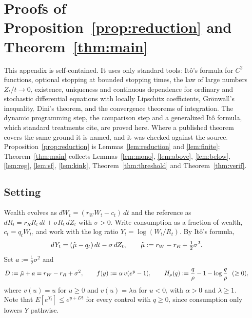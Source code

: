 \section{Proofs of Proposition~\ref{prop:reduction} and Theorem~\ref{thm:main}}\label{app:A}

This appendix is self-contained. It uses only standard tools: It\^o's formula for $C^2$ functions, optional stopping at bounded stopping times, the law of large numbers $Z_t/t\to0$, existence, uniqueness and continuous dependence for ordinary and stochastic differential equations with locally Lipschitz coefficients, Gr\"onwall's inequality, Dini's theorem, and the convergence theorems of integration. The dynamic programming step, the comparison step and a generalized It\^o formula, which standard treatments cite, are proved here. Where a published theorem covers the same ground it is named, and it was checked against the source. Proposition~\ref{prop:reduction} is Lemmas~\ref{lem:reduction} and \ref{lem:finite}; Theorem~\ref{thm:main} collects Lemmas~\ref{lem:mono}, \ref{lem:above}, \ref{lem:below}, \ref{lem:reg}, \ref{lem:sf}, \ref{lem:kink}, Theorem~\ref{thm:threshold} and Theorem~\ref{thm:verif}.


\subsection{Setting}

Wealth evolves as $dW_t=(r_W W_t-c_t)\,dt$ and the reference as $dR_t=r_R R_t\,dt+\sigma R_t\,dZ_t$ with $\sigma>0$. Write consumption as a fraction of wealth, $c_t=q_tW_t$, and work with the log ratio $Y_t=\log(W_t/R_t)$. By It\^o's formula,
\begin{equation}
dY_t=(\tilde\mu-q_t)\,dt-\sigma\,dZ_t,\qquad \tilde\mu:=r_W-r_R+\tfrac12\sigma^2 . \label{eq:Y}
\end{equation}
Set $a:=\tfrac12\sigma^2$ and
\begin{equation}
D:=\mut+a=r_W-r_R+\sigma^2,\qquad f(y):=\alpha\,v(e^y-1),\qquad H_\rho(q):=\frac q\rho-1-\log\frac q\rho\ \ (\ge 0),
\end{equation}
where $v(u)=u$ for $u\ge0$ and $v(u)=\lambda u$ for $u<0$, with $\alpha>0$ and $\lambda\ge1$. Note that $E[e^{Y_t}]\le e^{y+Dt}$ for every control with $q\ge0$, since consumption only lowers $Y$ pathwise.

